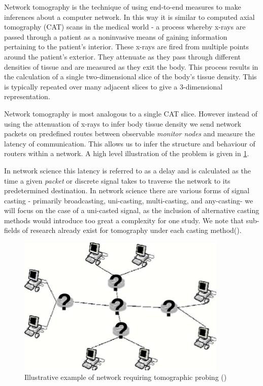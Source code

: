 Network tomography is the technique of using end-to-end measures to make inferences about a computer network. In this way it is similar to computed axial tomography (CAT) scans in the medical world - a process whereby x-rays are passed through a patient as a noninvasive means of gaining information pertaining to the patient's interior. These x-rays are fired from multiple points around the patient's exterior. They attenuate as they pass through different densities of tissue and are measured as they exit the body. This process results in the calculation of a single two-dimensional slice of the body's tissue density. This is typically repeated over many adjacent slices to give a 3-dimensional representation.\par
Network tomography is most analogous to a single CAT slice. However instead of using the attenuation of x-rays to infer body tissue density we send network packets on predefined routes between observable \textit{monitor nodes} and measure the latency of communication. This allows us to infer the structure and behaviour of routers within a network. A high level illustration of the problem is given in \ref{fig:nettom?}.\par
In network science this latency is referred to as a delay and is calculated as the time a given \textit{packet} or discrete signal takes to traverse the network to its predetermined destination. In network science there are various forms of signal casting - primarily broadcasting, uni-casting, multi-casting, and any-casting- we will focus on the case of a uni-casted signal, as the inclusion of alternative casting methods would introduce too great a complexity for one study. We note that sub-fields of research already exist for tomography under each casting method(\cite{lawrence_network_2006}).\par
\begin{figure}
    \centering
    \includegraphics[width=10cm]{figs/intro/nettom-illustration.png}
    \caption[Illustrative example of network requiring tomographic probing]{Illustrative example of network requiring tomographic probing (\cite{lawrence_network_2006})}
    \label{fig:nettom?}
\end{figure}

